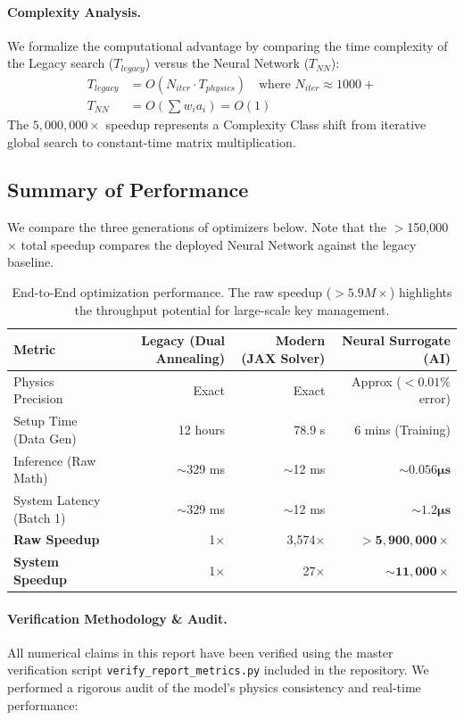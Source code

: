 \documentclass[11pt,a4paper]{article}
\begin{document}
\paragraph{Complexity Analysis.}
We formalize the computational advantage by comparing the time complexity of the Legacy search ($T_{legacy}$) versus the Neural Network ($T_{NN}$):
\begin{align}
T_{legacy} &= O(N_{iter} \cdot T_{physics}) \quad \text{where } N_{iter} \approx 1000+ \\
T_{NN} &= O(\sum w_i a_i) = O(1)
\end{align}
The $5,000,000\times$ speedup represents a Complexity Class shift from iterative global search to constant-time matrix multiplication.

\subsection{Summary of Performance}
We compare the three generations of optimizers below. Note that the $>$150,000$\times$ total speedup compares the deployed Neural Network against the legacy baseline.

\begin{table}[H]
\centering
\begin{tabular}{lrrr}
\toprule
Metric & Legacy (Dual Annealing) & Modern (JAX Solver) & Neural Surrogate (AI) \\
\midrule
Physics Precision & Exact & Exact & Approx ($<0.01\%$ error) \\
Setup Time (Data Gen) & 12 hours & 78.9 s & 6 mins (Training) \\
Inference (Raw Math) & $\sim$329 ms & $\sim$12 ms & $\mathbf{\sim 0.056 \mu s}$ \\
System Latency (Batch 1) & $\sim$329 ms & $\sim$12 ms & $\mathbf{\sim 1.2 \mu s}$ \\
\textbf{Raw Speedup} & 1$\times$ & 3,574$\times$ & $\mathbf{>5,900,000\times}$ \\
\textbf{System Speedup} & 1$\times$ & 27$\times$ & $\mathbf{\sim 11,000\times}$ \\
\bottomrule
\end{tabular}
\caption{End-to-End optimization performance. The raw speedup ($>5.9M\times$) highlights the throughput potential for large-scale key management.}
\label{tab:speedup}
\end{table}

\paragraph{Verification Methodology \& Audit.} 
All numerical claims in this report have been verified using the master verification script \texttt{verify\_report\_metrics.py} included in the repository. We performed a rigorous audit of the model's physics consistency and real-time performance:
\end{document}
